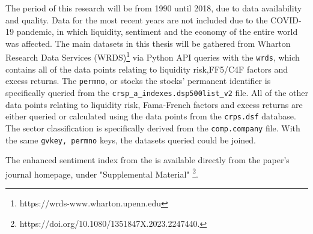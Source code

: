 
The period of this research will be from 1990 until 2018, due to data availability and quality. Data for the most recent years are not included due to the COVID-19 pandemic, in which liquidity, sentiment and the economy of the entire world was affected. The main datasets in this thesis will be gathered from Wharton Research Data Services (WRDS)\footnote{https://wrds-www.wharton.upenn.edu} via Python API queries with the \texttt{wrds}, which contains all of the data points relating to liquidity risk,FF5/C4F factors and excess returns. The \texttt{permno}, or stocks the stocks' permanent identifier is specifically queried from the \texttt{crsp\_a\_indexes.dsp500list\_v2}
file. All of the other data points relating to liquidity risk, Fama-French factors and excess returns are either queried or calculated using the data points from the \texttt{crps.dsf} database. The sector classification is specifically derived from the \texttt{comp.company} file. With the same \texttt{gvkey, permno} keys, the datasets queried could be joined.

The enhanced sentiment index from the  is available directly from the paper's journal homepage, under "Supplemental Material" \footnote{https://doi.org/10.1080/1351847X.2023.2247440.}.


